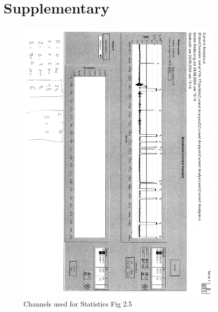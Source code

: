 \documentclass[a4paper,english,12pt,bibliography=totoc]{scrreprt}
\begin{document}




\printbibliography

\chapter{Supplementary}
\label{cha:Supplementary}
\begin{figure}[H]
    \centering
    \includegraphics[angle=90,width = 0.9\textwidth]{Analysis/ilovepdf_pages-to-jpg/doc00131020240719122038-1_page-0001.jpg}
    \caption{Channels used for Statistics Fig 2.5}
    \label{fig:enter-label}
\end{figure}
\end{document}
